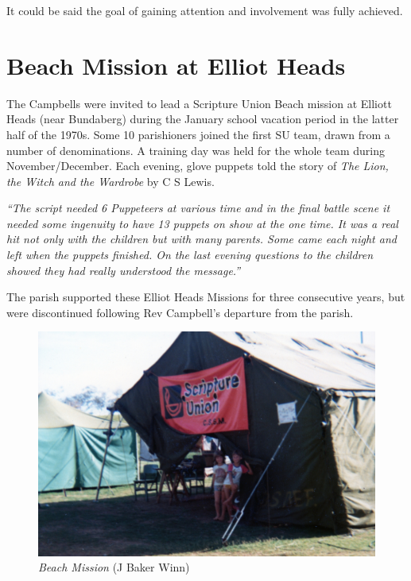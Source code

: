 \smallskip


It could be said the goal of gaining attention and involvement was fully achieved.



\section{Beach Mission at Elliot Heads}



The Campbells were invited to lead a Scripture Union Beach mission at Elliott Heads (near Bundaberg) during the January school vacation period in the latter half of the 1970s. Some 10 parishioners joined the first SU team, drawn from a number of denominations. A training day was held for the whole team during November/December. Each evening, glove puppets told the story of \emph{The Lion, the Witch and the Wardrobe} by C S Lewis.



\emph{``The script needed 6 Puppeteers at various time and in the final battle scene it needed some ingenuity to have 13 puppets on show at the one time. It was a real hit not only with the children but with many parents. Some came each night and left when the puppets finished. On the last evening questions to the children showed they had really understood the message.''}



The parish supported these Elliot Heads Missions for three consecutive years, but were discontinued following Rev Campbell's departure from the parish.









\begin{figure}[!htb]
\begin{center}
\includegraphics[width=1.\textwidth,center]{../images/beachMission1980.jpg}
\caption{{\itshape Beach Mission} {\scriptsize(J Baker Winn)}}
\end{center}
\end{figure}




